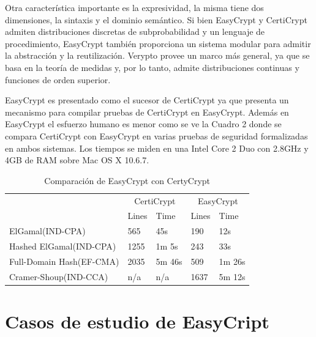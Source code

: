 \documentclass[runningheads]{llncs}
\begin{document}
 Otra característica importante es la expresividad, la misma tiene dos dimensiones, la sintaxis y el dominio semántico. Si bien EasyCrypt y CertiCrypt admiten distribuciones discretas de subprobabilidad y un lenguaje de procedimiento, EasyCrypt también proporciona un sistema modular para admitir la abstracción y la reutilización. Verypto provee un marco más general, ya que se basa en la teoría de medidas y, por lo tanto, admite distribuciones continuas y funciones de orden superior.

EasyCrypt es presentado como el sucesor de CertiCrypt ya que  presenta un mecanismo para compilar pruebas de CertiCrypt en EasyCrypt. Además en EasyCrypt el esfuerzo humano es menor como se ve la Cuadro 2 donde se compara CertiCrypt con EasyCrypt en varias pruebas de seguridad formalizadas en ambos sistemas. Los tiempos se miden en una Intel Core 2 Duo con 2.8GHz y 4GB de RAM sobre Mac OS X 10.6.7.


\begin{table}[H]
  \caption{Comparación de EasyCrypt con CertyCrypt}
  \label{tab:simple1}
  \centering
  \begin{tabular}{ |p{3.5cm}|p{1.5cm}|p{1.5cm}|p{1.5cm}|p{1.5cm}|  }
 \hline
 & \multicolumn{2}{|c|}{CertiCrypt} & \multicolumn{2}{|c|}{EasyCrypt} \\\cline{2-5}

 &Lines&Time&Lines&Time\\\cline{2-5}
 \hline
 ElGamal(IND-CPA) & 565 & 45s & 190 & 12s \\
 Hashed ElGamal(IND-CPA) & 1255  & 1m 5s & 243  & 33s\\
 Full-Domain Hash(EF-CMA) & 2035 & 5m 46s&  509 & 1m 26s\\
 Cramer-Shoup(IND-CCA) & n/a & n/a & 1637 & 5m 12s\\
 \hline
\end{tabular}
\end{table}



\section{Casos de estudio de EasyCript}
\end{document}
